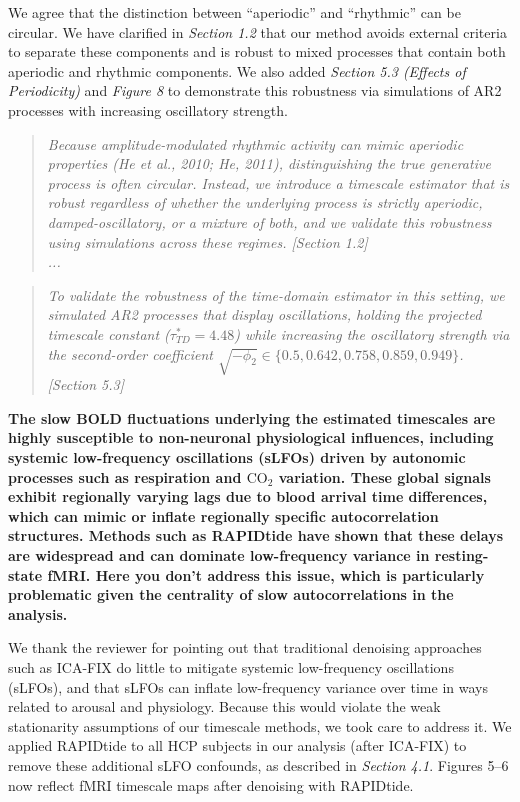\documentclass[docs/main.tex]{subfiles}
\newcommand{\reviewercomment}[1]{\vspace{0.3cm}\noindent\textbf{#1}\vspace{0.15cm}}
\newcommand{\manuscriptquote}[1]{\begin{quote}\textit{#1}\end{quote}}
\begin{document}
We agree that the distinction between ``aperiodic'' and ``rhythmic'' can be circular. We have clarified in \textit{Section 1.2} that our method avoids external criteria to separate these components and is robust to mixed processes that contain both aperiodic and rhythmic components. We also added \textit{Section 5.3 (Effects of Periodicity)} and \textit{Figure 8} to demonstrate this robustness via simulations of AR2 processes with increasing oscillatory strength.

\manuscriptquote{Because amplitude-modulated rhythmic activity can mimic aperiodic properties (He et al., 2010; He, 2011), distinguishing the true generative process is often circular. Instead, we introduce a timescale estimator that is robust regardless of whether the underlying process is strictly aperiodic, damped-oscillatory, or a mixture of both, and we validate this robustness using simulations across these regimes. [Section 1.2]\\...}

\manuscriptquote{To validate the robustness of the time-domain estimator in this setting, we simulated AR2 processes that display oscillations, holding the projected timescale constant ($\tau_{TD}^* = 4.48$) while increasing the oscillatory strength via the second-order coefficient $\sqrt{-\phi_2} \in \{0.5, 0.642, 0.758, 0.859, 0.949\}$. [Section 5.3]}

\reviewercomment{The slow BOLD fluctuations underlying the estimated timescales are highly susceptible to non-neuronal physiological influences, including systemic low-frequency oscillations (sLFOs) driven by autonomic processes such as respiration and $\text{CO}_2$ variation. These global signals exhibit regionally varying lags due to blood arrival time differences, which can mimic or inflate regionally specific autocorrelation structures. Methods such as RAPIDtide have shown that these delays are widespread and can dominate low-frequency variance in resting-state fMRI. Here you don't address this issue, which is particularly problematic given the centrality of slow autocorrelations in the analysis.}

We thank the reviewer for pointing out that traditional denoising approaches such as ICA-FIX do little to mitigate systemic low-frequency oscillations (sLFOs), and that sLFOs can inflate low-frequency variance over time in ways related to arousal and physiology. Because this would violate the weak stationarity assumptions of our timescale methods, we took care to address it. We applied RAPIDtide to all HCP subjects in our analysis (after ICA-FIX) to remove these additional sLFO confounds, as described in \textit{Section 4.1}. Figures 5–6 now reflect fMRI timescale maps after denoising with RAPIDtide.
\end{document}
